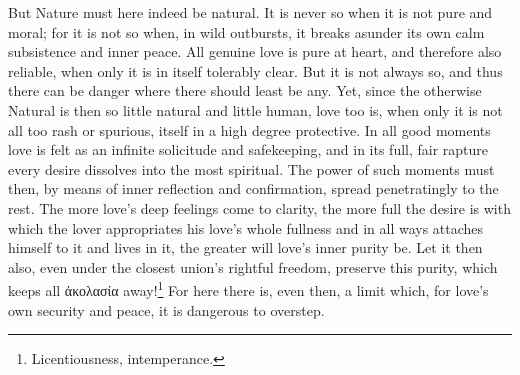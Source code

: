\documentclass[12pt,a4paper]{book}
\begin{document}
But Nature must here indeed be natural. It is never so when it is not pure
and moral; for it is not so when, in wild outbursts, it breaks asunder its
own calm subsistence and inner peace. All genuine love is pure at heart,
and therefore also reliable, when only it is in itself tolerably clear. But
it is not always so, and thus there can be danger where there should least
be any. Yet, since the otherwise Natural is then so little natural and
little human, love too is, when only it is not all too rash or spurious,
itself in a high degree protective. In all good moments love is felt as an
infinite solicitude and safekeeping, and in its full, fair rapture every
desire dissolves into the most spiritual. The power of such moments must
then, by means of inner reflection and confirmation, spread penetratingly
to the rest. The more love's deep feelings come to clarity, the more full
the desire is with which the lover appropriates his love's whole fullness
and in all ways attaches himself to it and lives in it, the greater will
love's inner purity be. Let it then also, even under the closest union's
rightful freedom, preserve this purity, which keeps all
ἀκολασία away!\footnote{Licentiousness, intemperance.} For here
there is, even then, a limit which, for love's own security and peace, it is
dangerous to overstep.
\end{document}
